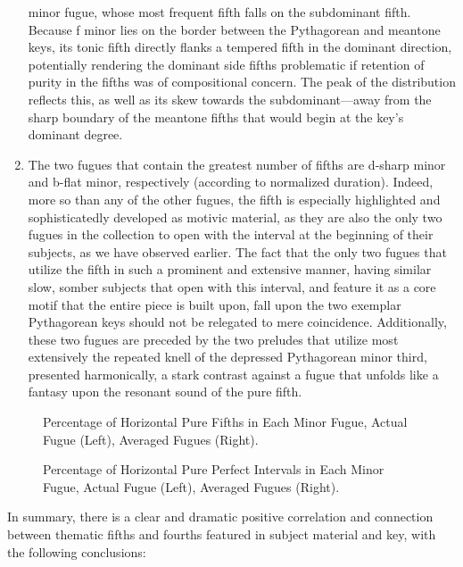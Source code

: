 \begin{enumerate}
  minor fugue, whose most frequent fifth falls on the subdominant fifth.
  Because f minor lies on the border between the Pythagorean and
  meantone keys, its tonic fifth directly flanks a tempered fifth in the
  dominant direction, potentially rendering the dominant side fifths
  problematic if retention of purity in the fifths was of compositional
  concern. The peak of the distribution reflects this, as well as its
  skew towards the subdominant---away from the sharp boundary of the
  meantone fifths that would begin at the key's dominant degree.
\item
  The two fugues that contain the greatest number of fifths are d-sharp
  minor and b-flat minor, respectively (according to normalized
  duration). Indeed, more so than any of the other fugues, the fifth is
  especially highlighted and sophisticatedly developed as motivic
  material, as they are also the only two fugues in the collection to
  open with the interval at the beginning of their subjects, as we have
  observed earlier. The fact that the only two fugues that utilize the
  fifth in such a prominent and extensive manner, having similar slow,
  somber subjects that open with this interval, and feature it as a core
  motif that the entire piece is built upon, fall upon the two exemplar
  Pythagorean keys should not be relegated to mere coincidence.
  Additionally, these two fugues are preceded by the two preludes that
  utilize most extensively the repeated knell of the depressed
  Pythagorean minor third, presented harmonically, a stark contrast
  against a fugue that unfolds like a fantasy upon the resonant sound of
  the pure fifth.
\end{enumerate}



\begin{figure}[H]
\vspace{1.5em}
    \centering
    \caption[Percentage of Horizontal Pure Fifths in Each Minor Fugue. ]{Percentage of Horizontal Pure Fifths in Each Minor Fugue, Actual Fugue (Left), Averaged Fugues (Right).}
\end{figure}

\begin{figure}[H]
\vspace{1.5em}
    \centering
    \caption[Percentage of Horizontal Perfect Intervals in Each Minor Fugue. ]{Percentage of Horizontal Pure Perfect Intervals in Each Minor Fugue, Actual Fugue (Left), Averaged Fugues (Right).}
\end{figure}    In summary, there is a clear and dramatic positive correlation and
connection between thematic fifths and fourths featured in subject
material and key, with the following conclusions:

